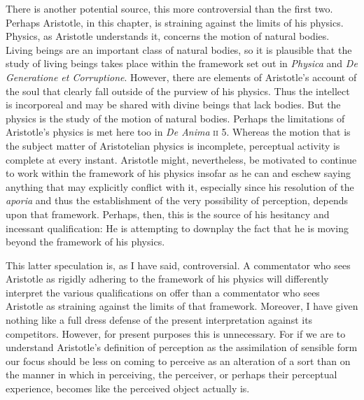 There is another potential source, this more controversial than the first two. Perhaps Aristotle, in this chapter, is straining against the limits of his physics. Physics, as Aristotle understands it, concerns the motion of natural bodies. Living beings are an important class of natural bodies, so it is plausible that the study of living beings takes place within the framework set out in \emph{Physica} and \emph{De Generatione et Corruptione}. However, there are elements of Aristotle's account of the soul that clearly fall outside of the purview of his physics. Thus the intellect is incorporeal and may be shared with divine beings that lack bodies. But the physics is the study of the motion of natural bodies. Perhaps the limitations of Aristotle's physics is met here too in \emph{De Anima} \textsc{ii} 5. Whereas the motion that is the subject matter of Aristotelian physics is incomplete, perceptual activity is complete at every instant. Aristotle might, nevertheless, be motivated to continue to work within the framework of his physics insofar as he can and eschew saying anything that may explicitly conflict with it, especially since his resolution of the \emph{aporia} and thus the establishment of the very possibility of perception, depends upon that framework. Perhaps, then, this is the source of his hesitancy and incessant qualification: He is attempting to downplay the fact that he is moving beyond the framework of his physics. 

This latter speculation is, as I have said, controversial. A commentator who sees Aristotle as rigidly adhering to the framework of his physics will differently interpret the various qualifications on offer than a commentator who sees Aristotle as straining against the limits of that framework. Moreover, I have given nothing like a full dress defense of the present interpretation against its competitors. However, for present purposes this is unnecessary. For if we are to understand Aristotle's definition of perception as the assimilation of sensible form our focus should be less on coming to perceive as an alteration of a sort than on the manner in which in perceiving, the perceiver, or perhaps their perceptual experience, becomes like the perceived object actually is.


